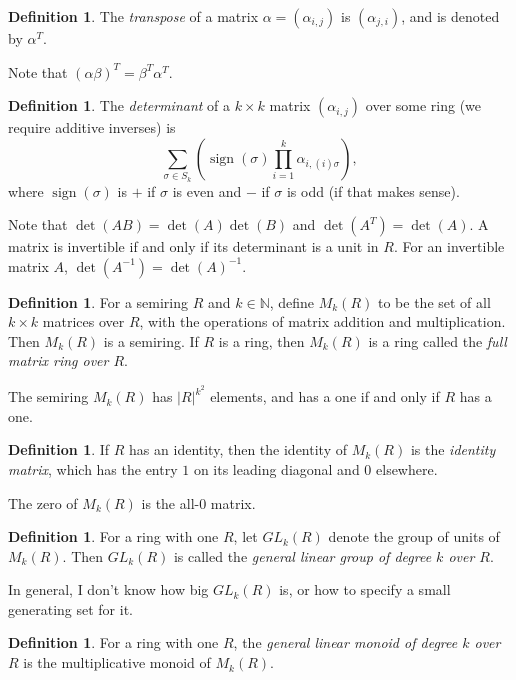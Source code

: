 \documentclass{article}
\newcommand{\N}{\mathbb{N}}
\theoremstyle{definition}
\newtheorem{defn}[thm]{Definition}
\begin{document}
\begin{defn}
  The \emph{transpose} of a matrix $\alpha = (\alpha_{i, j})$ is $(\alpha_{j, i})$,
  and is denoted by $\alpha^{T}$.
\end{defn}

Note that ${(\alpha\beta)}^{T} = \beta^{T}\alpha^{T}$.

\begin{defn}
  The \emph{determinant} of a $k \times k$ matrix $(\alpha_{i,
  j})$ over some ring (we require additive inverses) is
  $$\displaystyle\sum_{\sigma \in S_{k}}
      \left( \operatorname{sign}(\sigma)
      \prod_{i = 1}^{k}
      \alpha_{i, (i)\sigma}
      \right),$$
  where $\operatorname{sign}(\sigma)$ is $+$ if $\sigma$ is even and $-$ if
  $\sigma$ is odd (if that makes sense).
\end{defn}

Note that $\det(AB) = \det(A)\det(B)$ and  $\det(A^{T}) = \det(A)$.
A matrix is invertible if and only if its determinant is a unit in $R$.
For an invertible matrix $A$, $\det(A^{-1}) = {\det(A)}^{-1}$.


\begin{defn}
  For a semiring $R$ and $k \in \N$, define $M_{k}(R)$ to be the set of all $k
  \times k$ matrices over $R$, with the operations of matrix addition and
  multiplication. Then $M_{k}(R)$ is a semiring. If $R$ is a ring, then
  $M_{k}(R)$ is a ring called the \emph{full matrix ring over $R$}.
\end{defn}

The semiring $M_{k}(R)$ has $|R|^{k^{2}}$ elements, and has a one if and only if
$R$ has a one.

\begin{defn}
  If $R$ has an identity, then the identity of $M_{k}(R)$ is the \emph{identity
  matrix}, which has the entry $1$ on its leading diagonal and $0$ elsewhere.
\end{defn}

The zero of $M_{k}(R)$ is the all-$0$ matrix.

\begin{defn}
  For a ring with one $R$, let $GL_{k}(R)$ denote the group of units of
  $M_{k}(R)$.  Then $GL_{k}(R)$ is called the \emph{general linear group of
  degree $k$ over $R$}.
\end{defn}

In general, I don't know how big $GL_{k}(R)$ is, or how to specify a small
generating set for it.

\begin{defn}
  For a ring with one $R$, the \emph{general linear monoid of degree $k$
  over $R$} is the multiplicative monoid of $M_{k}(R)$.
\end{defn}
\end{document}
